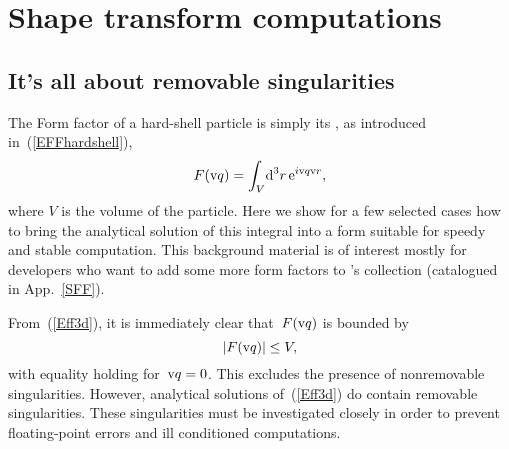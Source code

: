 
\chapter{Shape transform computations}  \label{SFFcomp}


\def\FFP{F_\parallel}
\def\FFPm{\Delta_\parallel}
\def\expm{\text{exp}_{-1}}
\def\R{\v{R}}
\let\textE=\E
\def\E{\v{E}}
\def\Gp{\Gamma_\parallel}
\def\x{\v{x}}
\def\V{\v{V}}
\def\qp{\v{p}}
\def\n{\v{\hat n}}
\def\uq{\v{\hat q}}
\def\uqp{\v{\hat p}}

\section{It's all about removable singularities}\label{SShapeTrafIntro}

The Form factor of a hard-shell particle is simply its \textE{shape transform},
as introduced in~(\ref{EFFhardshell}),
\begin{equation}\label{Eff3d}
  F(\text{v}{q})=\int_V\!\text{d}^3r\, \text{e}^{i\text{v}{q}\text{v}{r}},
\end{equation}
where $V$ is the volume of the particle.
Here we show for a few selected cases
how to bring the analytical solution of this integral into a form
 suitable for speedy and stable computation.
This background material is of interest mostly for
developers who want to add some more form factors to \BornAgain's collection
(catalogued in App.~\ref{SFF}).

%
From~(\ref{Eff3d}), it is immediately clear that~$F(\text{v}{q})$ is bounded by
\begin{equation}
  |F(\text{v}{q})|\le V,
\end{equation}
with equality holding for~$\text{v}{q}=0$.
This excludes the presence of nonremovable singularities.
However, analytical solutions of~(\ref{Eff3d}) do contain
removable singularities.
These singularities must be investigated closely
in order to prevent floating-point errors and ill conditioned computations.

